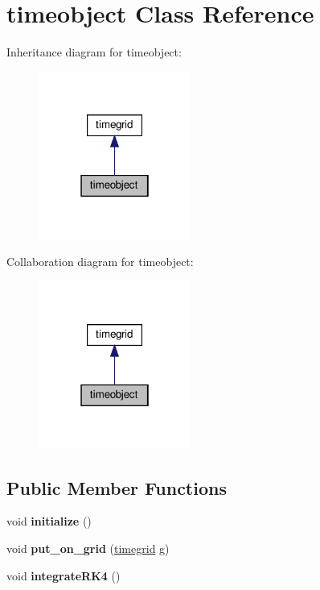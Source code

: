 \hypertarget{classtimeobject}{}\section{timeobject Class Reference}
\label{classtimeobject}


Inheritance diagram for timeobject\+:\nopagebreak
\begin{figure}[H]
\begin{center}
\leavevmode
\includegraphics[width=142pt]{classtimeobject__inherit__graph}
\end{center}
\end{figure}


Collaboration diagram for timeobject\+:\nopagebreak
\begin{figure}[H]
\begin{center}
\leavevmode
\includegraphics[width=142pt]{classtimeobject__coll__graph}
\end{center}
\end{figure}
\subsection*{Public Member Functions}
\begin{DoxyCompactItemize}
\item 
\mbox{\label{classtimeobject_a2c1affa66ac75529546cd3dffd3e9db8}} 
void {\bfseries initialize} ()
\item 
\mbox{\label{classtimeobject_acf31352bc20f227005632700c6452521}} 
void {\bfseries put\+\_\+on\+\_\+grid} (\hyperlink{classtimegrid}{timegrid} g)
\item 
\mbox{\label{classtimeobject_ae5b366ae24815772e59eb22278b9ab73}} 
void {\bfseries integrate\+R\+K4} ()
\end{DoxyCompactItemize}
